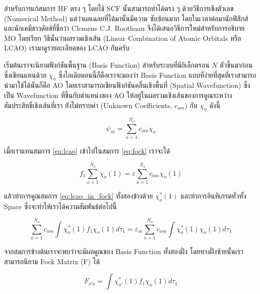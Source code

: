 สำหรับการแก้สมการ HF ตรง ๆ โดยใช้ SCF นั้นสามารถทำได้ตรง ๆ ด้วยวิธีการเชิงตัวเลข (Numerical Method) แต่ว่าผลเฉลยที่ได้มานั้นมีความ%
ซับซ้อนมาก โดยในเวลาต่อมานักฟิสิกส์และนักเคมีชาวดัตช์ที่ชื่อว่า Clemens C.J. Roothaan จึงได้เสนอวิธีการใหม่สำหรับการอธิบาย MO โดยเรียก%
วิธีนั้นว่าผลรวมเชิงเส้น (Linear Combination of Atomic Orbitals หรือ LCAO)\autocite{atkins2010} เรามาดูรายละเอียดของ LCAO 
กันครับ 

เริ่มต้นเราจะนิยามฟังก์ชันพื้นฐาน (Basis Function) สำหรับระบบที่มีอิเล็กตรอน $N$ ตัวขึ้นมาก่อน ซึ่งเขียนแทนด้วย $\chi_{o}$
ซึ่งไอเดียตอนนี้ก็คือเราจะมองว่า Basis Function แบบที่ง่ายที่สุดที่เราสามารถนำมาใช้ได้นั่นก็คือ AO โดยเราสามารถเขียนฟังก์ชันคลื่นเชิงพื้นที่ 
(Spatial Wavefunction) ซึ่งเป็น Wavefunction ที่ขึ้นกับตำแหน่งของ AO ให้อยู่ในผลรวมเชิงเส้นของการคูณระหว่างสัมประสิทธิ์เชิงเส้นที่เรา%
ยังไม่ทราบค่า (Unknown Coefficients, $c_{om}$) กับ $\chi_{o}$ ดังนี้

\begin{equation}\label{eq:lcao}
    \psi_{m} = \sum^{N_{o}}_{o=1} c_{om} \chi_{o} 
\end{equation}

\noindent เมื่อเราแทนสมการ \ref{eq:lcao} เข้าไปในสมการ \ref{eq:fock} เราจะได้

\begin{equation}\label{eq:lcao_in_fock}
    f_{1} \sum^{N_{o}}_{o=1} \chi_{o}(1) = \varepsilon \sum^{N_{o}}_{o=1} c_{om} \chi_{o}(1)
\end{equation}

\noindent แล้วทำการคูณสมการ \ref{eq:lcao_in_fock} ทั้งสองข้างด้วย $\chi^{*}_{o}(1)$ และทำการอินทิเกรตทั่วทั้ง Space 
ซึ่งจะทำให้เราได้ความสัมพันธ์ต่อไปนี้

\begin{equation}\label{eq:lcao_in_fock_int}
    \sum^{N_{o}}_{o=1} c_{om} \int \chi^{*}_{o}(1) f_{1} \chi_{o}(1) d\tau_{1} =
    \varepsilon_{m} \sum^{N_{o}}_{o=1} c_{om} \int \chi^{*}_{o}(1) \chi_{o}(1) d\tau_{1}
\end{equation}

\noindent จากสมการข้างต้นเราจะพบว่าจะมีผลคูณของ Basis Function ทั้งสองฝั่ง โดยทางฝั่งซ้ายนั้นเราสามารถนิยาม Fock Matrix (F) ได้

\begin{equation}\label{eq:matrix_fock}
    F_{o'o} = \int \chi^{*}_{o'}(1) f_{1} \chi_{o}(1) d\tau_{1}
\end{equation}

